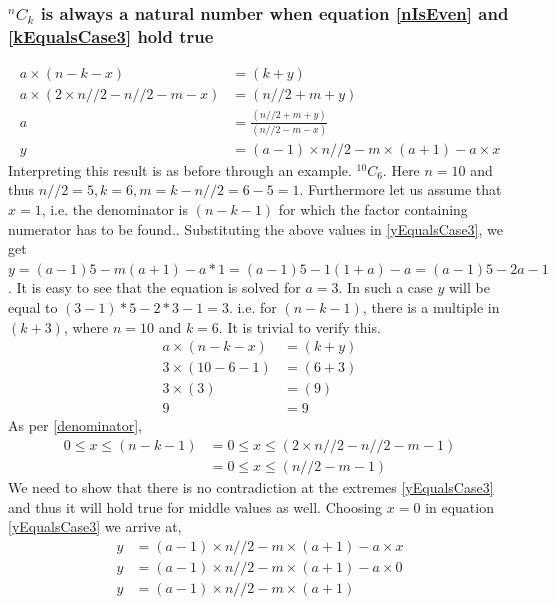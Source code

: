 \documentclass[12pt, twoside]{article}
\newcommand*{\Combination}[2]{{}^{#1}C_{#2}}%
\begin{document}
\subsubsection{$\Combination{n}{k}$ is always a natural number when equation \eqref{nIsEven} and \eqref{kEqualsCase3} hold true}\label{ProofkEqualsCase3}
\begin{align}
	a \times (n-k-x) &= (k+y) \nonumber \\
	a \times (2\times n//2 - n//2 - m - x) &= (n//2 + m + y) \nonumber \\
	a &= \frac{(n//2 +m + y)}{(n//2 -m - x)} \nonumber \\
	y &= (a-1)\times n//2 - m \times (a+1) - a\times x \label{yEqualsCase3}	
\end{align}
Interpreting this result is as before through an example.\newline
$\Combination{10}{6}$. Here $n = 10$ and thus $n//2 = 5, k = 6, m = k - n//2 = 6 - 5 = 1$. Furthermore let us assume that $x = 1$, i.e. the denominator is $(n-k-1)$ for which the factor containing numerator has to be found.\newline.
Substituting the above values in \eqref{yEqualsCase3}, we get  $y = (a-1)5-m(a+1)-a*1 = (a-1)5-1(1+a)-a = (a-1)5-2a-1$\newline. 
It is easy to see that the equation is solved for $a = 3$. In such a case $y$ will be equal to $(3-1)*5-2*3-1 = 3$. i.e. for $(n-k-1)$, there is a multiple in $(k+3)$, where $n=10$ and $k=6$. It is trivial to verify this.
\begin{align*}
	a \times (n-k-x) &= (k+y) \\
	3 \times (10-6-1) &= (6+3) \\
	3 \times (3) &= (9) \\
	9 &= 9 
\end{align*}
As per \eqref{denominator}, 
\begin{align}
	0 \leq x \leq (n-k-1) &= 0 \leq x \leq (2\times n//2-n//2-m-1) \nonumber \\
	&= 0 \leq x \leq (n//2-m-1) \label{LimitOfXforYEqualsCase3}
\end{align}
We need to show that there is no contradiction at the extremes \eqref{yEqualsCase3} and thus it will hold true for middle values as well.
Choosing $x = 0$ in equation \eqref{yEqualsCase3} we arrive at,
\begin{align*}
	y &= (a-1)\times n//2 - m \times (a+1) - a\times x \\
	y &= (a-1)\times n//2 - m \times (a+1) - a\times 0 \\
	y &= (a-1)\times n//2 - m \times (a+1)
\end{align*}
\end{document}
